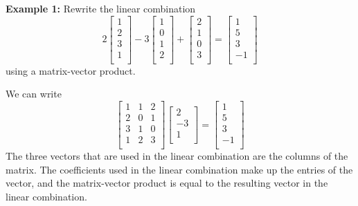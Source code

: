 \documentclass{article}
\begin{document}
\begin{examples}
  \textbf{Example 1:}\newline
  Rewrite the linear combination
  \[
    2
    \begin{bmatrix}
      1\\
      2\\
      3\\
      1\\
    \end{bmatrix}
    -3
    \begin{bmatrix}
      1\\
      0\\
      1\\
      2\\
    \end{bmatrix}
    +
    \begin{bmatrix}
      2\\
      1\\
      0\\
      3\\
    \end{bmatrix}
    =
    \begin{bmatrix}
      1\\
      5\\
      3\\
      -1\\
    \end{bmatrix}
  \] using a matrix-vector product.

  We can write
  \[
    \begin{bmatrix}
      1 & 1 & 2\\
      2 & 0 & 1\\
      3 & 1 & 0\\
      1 & 2 & 3\\
    \end{bmatrix}
    \begin{bmatrix}
      2\\
      -3\\
      1\\
    \end{bmatrix}
    =
    \begin{bmatrix}
      1\\
      5\\
      3\\
      -1\\
    \end{bmatrix}
  \]
  The three vectors that are used in the linear combination are the columns of the matrix. The coefficients used in the linear combination make up the entries of the vector, and the matrix-vector product is equal to the resulting vector in the linear combination.


\end{examples}
\end{document}
